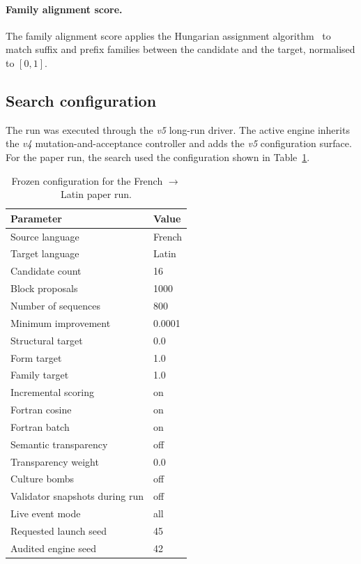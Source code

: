 \documentclass[11pt]{article}
\begin{document}
\paragraph{Family alignment score.}
The family alignment score applies the Hungarian assignment
algorithm~\cite{kuhn1955} to match suffix and prefix families between the
candidate and the target, normalised to $[0, 1]$.

\subsection{Search configuration}

The run was executed through the \emph{v5} long-run driver. The active engine
inherits the \emph{v4} mutation-and-acceptance controller and adds the
\emph{v5} configuration surface. For the paper run, the search used the
configuration shown in Table~\ref{tab:runconfig}.

\begin{table}[h]
\centering
\caption{Frozen configuration for the French $\rightarrow$ Latin paper run.}
\label{tab:runconfig}
\begin{tabular}{ll}
\toprule
Parameter & Value \\
\midrule
Source language & French \\
Target language & Latin \\
Candidate count & 16 \\
Block proposals & 1000 \\
Number of sequences & 800 \\
Minimum improvement & 0.0001 \\
Structural target & 0.0 \\
Form target & 1.0 \\
Family target & 1.0 \\
Incremental scoring & on \\
Fortran cosine & on \\
Fortran batch & on \\
Semantic transparency & off \\
Transparency weight & 0.0 \\
Culture bombs & off \\
Validator snapshots during run & off \\
Live event mode & all \\
Requested launch seed & 45 \\
Audited engine seed & 42 \\
\bottomrule
\end{tabular}
\end{table}
\end{document}
